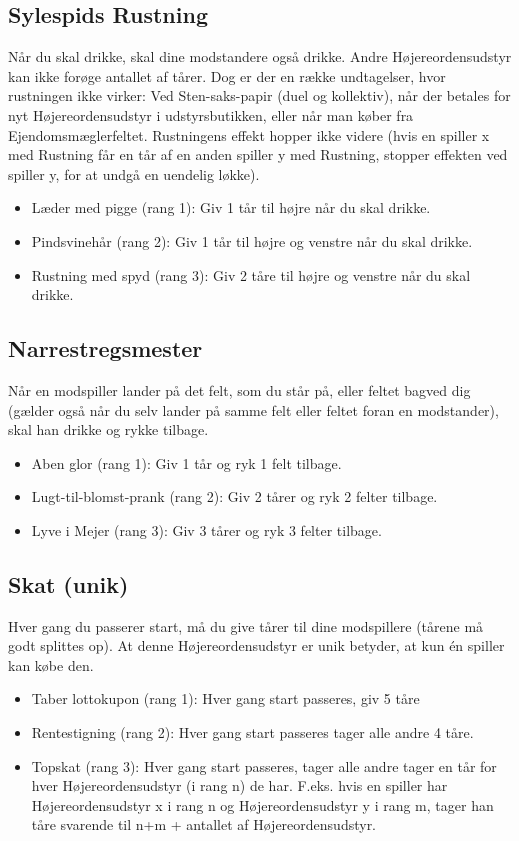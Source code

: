 \documentclass{article}
\begin{document}
\subsection{Sylespids Rustning}
Når du skal drikke, skal dine modstandere også drikke. Andre Højereordensudstyr kan ikke forøge antallet af tårer. Dog er der en række undtagelser, hvor rustningen ikke virker: Ved Sten-saks-papir (duel og kollektiv), når der betales for nyt Højereordensudstyr i udstyrsbutikken, eller når man køber fra Ejendomsmæglerfeltet. Rustningens effekt hopper ikke videre (hvis en spiller x med Rustning får en tår af en anden spiller y med Rustning, stopper effekten ved spiller y, for at undgå en uendelig løkke). 

\begin{itemize}
	\item Læder med pigge (rang 1): Giv 1 tår til højre når du skal drikke.
	\item Pindsvinehår (rang 2): Giv 1 tår til højre og venstre når du skal drikke.
	\item Rustning med spyd (rang 3): Giv 2 tåre til højre og venstre når du skal drikke.
\end{itemize}
 
\subsection{Narrestregsmester}
Når en modspiller lander på det felt, som du står på, eller feltet bagved dig (gælder også når du selv lander på samme felt eller feltet foran en modstander), skal han drikke og rykke tilbage. 

\begin{itemize}
	\item Aben glor (rang 1): Giv 1 tår og ryk 1 felt tilbage.
	\item Lugt-til-blomst-prank (rang 2): Giv 2 tårer og ryk 2 felter tilbage.
	\item Lyve i Mejer (rang 3): Giv 3 tårer og ryk 3 felter tilbage.
\end{itemize}
 
\subsection{Skat (unik)}
Hver gang du passerer start, må du give tårer til dine modspillere (tårene må godt splittes op). At denne Højereordensudstyr er unik betyder, at kun én spiller kan købe den.

\begin{itemize}
	\item Taber lottokupon (rang 1): Hver gang start passeres, giv 5 tåre
	\item Rentestigning (rang 2): Hver gang start passeres tager alle andre 4 tåre.
	\item Topskat (rang 3): Hver gang start passeres, tager alle andre tager en tår for hver Højereordensudstyr (i rang n) de har. F.eks. hvis en spiller har Højereordensudstyr x i rang n og Højereordensudstyr y i rang m, tager han tåre svarende til n+m + antallet af Højereordensudstyr.
\end{itemize}
 
\end{document}
